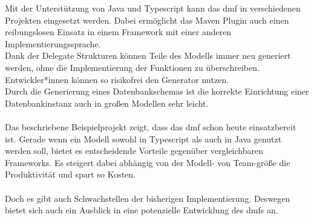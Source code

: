 \documentclass[./einleitung.tex]{subfiles}
\begin{document}
Mit der Unterstützung von Java und Typescript kann das \acrshort{dmf} in verschiedenen Projekten eingesetzt werden.
Dabei ermöglicht das Maven Plugin auch einen reibungslosen Einsatz in einem Framework mit einer anderen Implementierungssprache.\\
Dank der Delegate Strukturen können Teile des Modells immer neu generiert werden, ohne die Implementierung der Funktionen zu überschreiben.
Entwickler*innen können so risikofrei den Generator nutzen.\\
Durch die Generierung eines Datenbankschemas ist die korrekte Einrichtung einer Datenbankinstanz auch in großen Modellen sehr leicht.
\\\\
Das beschriebene Beispielprojekt zeigt, dass das \acrshort{dmf} schon heute einsatzbereit ist.
Gerade wenn ein Modell sowohl in Typescript als auch in Java genutzt werden soll, bietet es entscheidende Vorteile gegenüber vergleichbaren Frameworks.
Es steigert dabei abhängig von der Modell- von Team-größe die Produktivität und spart so Kosten.
\\\\
Doch es gibt auch Schwachstellen der bisherigen Implementierung.
Deswegen bietet sich auch ein Ausblick in eine potenzielle Entwicklung des \acrshort{dmf}s an.
\end{document}
